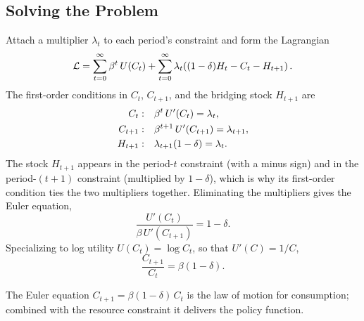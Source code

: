 
\subsection{Solving the Problem}

Attach a multiplier $\lambda_t$ to each period's constraint and form the Lagrangian
\[
\mathcal{L} = \sum_{t=0}^{\infty} \beta^t\, U(C_t) + \sum_{t=0}^{\infty} \lambda_t\!\left((1-\delta)H_t - C_t - H_{t+1}\right).
\]
The first-order conditions in $C_t$, $C_{t+1}$, and the bridging stock $H_{t+1}$ are
\[
\begin{aligned}
C_t:&\quad \beta^t\, U'(C_t) = \lambda_t, \\
C_{t+1}:&\quad \beta^{t+1}\, U'(C_{t+1}) = \lambda_{t+1}, \\
H_{t+1}:&\quad \lambda_{t+1}(1-\delta) = \lambda_t.
\end{aligned}
\]
The stock $H_{t+1}$ appears in the period-$t$ constraint (with a minus sign) and in the period-$(t+1)$ constraint (multiplied by $1-\delta$), which is why its first-order condition ties the two multipliers together. Eliminating the multipliers gives the Euler equation,
\[
\frac{U'(C_t)}{\beta\, U'(C_{t+1})} = 1 - \delta.
\]
Specializing to log utility $U(C_t) = \log C_t$, so that $U'(C) = 1/C$,
\[
\frac{C_{t+1}}{C_t} = \beta(1-\delta).
\]


The Euler equation $C_{t+1} = \beta(1-\delta)\,C_t$ is the law of motion for consumption; combined with the resource constraint it delivers the policy function.

